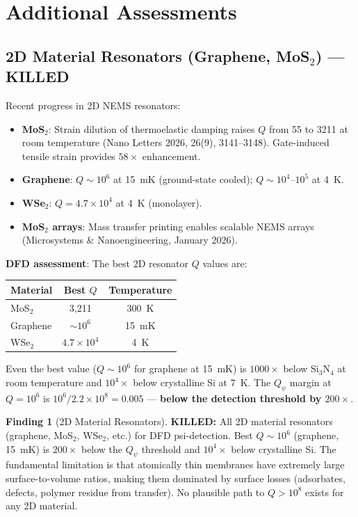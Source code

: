 \documentclass[11pt]{article}
\theoremstyle{definition}
\newtheorem{finding}[theorem]{Finding}
\theoremstyle{remark}
\newcommand{\ee}[1]{\times 10^{#1}}
\newcommand{\Qpsi}{Q_\psi}
\newcommand{\killed}[1]{\textcolor{red!70!black}{\textbf{KILLED:} #1}}
\begin{document}
\section{Additional Assessments}
\label{sec:additional}

\subsection{2D Material Resonators (Graphene, MoS$_2$) --- KILLED}
\label{sec:2d_killed}

Recent progress in 2D NEMS resonators:
\begin{itemize}[nosep]
\item \textbf{MoS$_2$}: Strain dilution of thermoelastic damping
  raises $Q$ from 55 to 3211 at room temperature (Nano Letters 2026,
  26(9), 3141--3148). Gate-induced tensile strain provides $58\times$
  enhancement.
\item \textbf{Graphene}: $Q \sim 10^6$ at 15~mK (ground-state cooled);
  $Q \sim 10^4$--$10^5$ at 4~K.
\item \textbf{WSe$_2$}: $Q = 4.7\ee{4}$ at 4~K (monolayer).
\item \textbf{MoS$_2$ arrays}: Mass transfer printing enables
  scalable NEMS arrays (Microsystems \& Nanoengineering, January 2026).
\end{itemize}

\textbf{DFD assessment}: The best 2D resonator $Q$ values are:
\begin{center}
\begin{tabular}{lcc}
\toprule
Material & Best $Q$ & Temperature \\
\midrule
MoS$_2$ & 3,211 & 300~K \\
Graphene & $\sim 10^6$ & 15~mK \\
WSe$_2$ & $4.7\ee{4}$ & 4~K \\
\bottomrule
\end{tabular}
\end{center}

Even the best value ($Q \sim 10^6$ for graphene at 15~mK) is
$1000\times$ below Si$_3$N$_4$ at room temperature and $10^4\times$
below crystalline Si at 7~K. The $\Qpsi$ margin at $Q = 10^6$ is
$10^6/2.2\ee{8} = 0.005$ --- \textbf{below the detection threshold
by $200\times$}.

\begin{finding}[2D Material Resonators]
\label{find:2d_killed}
\killed{All 2D material resonators (graphene, MoS$_2$, WSe$_2$, etc.)
for DFD psi-detection. Best $Q \sim 10^6$ (graphene, 15~mK) is
$200\times$ below the $\Qpsi$ threshold and $10^4\times$ below
crystalline Si. The fundamental limitation is that atomically thin
membranes have extremely large surface-to-volume ratios, making them
dominated by surface losses (adsorbates, defects, polymer residue
from transfer). No plausible path to $Q > 10^8$ exists for any 2D
material.}
\end{finding}
\end{document}
